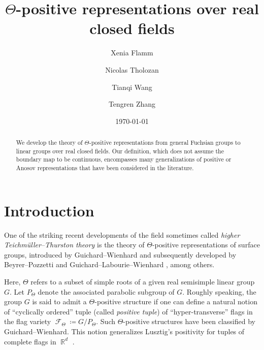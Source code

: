 \documentclass{amsart}
\theoremstyle{plain}
\theoremstyle{definition}
\DeclareMathOperator{\Fc}{\mathcal{F}}
\DeclareMathOperator{\Rb}{{\mathbb{R}}}
\newcommand{\1}{\mathbf{1}}
\begin{document}
\title[$\Theta$-positive representations over real closed fields]{$\Theta$-positive representations over real closed fields}

\author{Xenia Flamm}
\address{Institut des Hautes \'Etudes Scientifiques\newline
\indent Max-Planck Institute for Mathematics in the Sciences}


\author{Nicolas Tholozan}
\address{École Normale Supérieure PSL, CNRS}

\author{Tianqi Wang}
\address{Yale University}

\author{Tengren Zhang}
\address{National University of Singapore}

\date{\today}

\begin{abstract}
We develop the theory of $\Theta$-positive representations from  general Fuchsian groups to linear groups over real closed fields. Our definition, which does not assume the boundary map to be continuous, encompasses many generalizations of positive or Anosov representations that have been considered in the literature. 
\end{abstract}

\maketitle

\setcounter{tocdepth}{2}
\tableofcontents

\section{Introduction}
One of the striking recent developments of the field sometimes called \emph{higher Teichm\"uller--Thurston theory} is the theory of $\Theta$-positive representations of surface groups, introduced by Guichard--Wienhard \cite{guichard2025generalizing} and subsequently developed by Beyrer--Pozzetti \cite{beyrer2021positive} and Guichard--Labourie--Wienhard \cite{GLW}, among others.

Here, $\Theta$ refers to a subset of simple roots of a given real semisimple linear group~$G$. Let $P_\Theta$ denote the associated parabolic subgroup of $G$. Roughly speaking, the group $G$ is said to admit a $\Theta$-positive structure if one can define a natural notion of ``cyclically ordered'' tuple (called \emph{positive tuple}) of ``hyper-transverse'' flags in the flag variety $\Fc_\Theta \coloneqq G/P_\Theta$. Such $\Theta$-positive structures have been classified by Guichard--Wienhard. This notion generalizes Lusztig's positivity for tuples of complete flags in $\Rb^d$ \cite{Lusztig_TotalPositivityReductiveGroups}.
\end{document}
